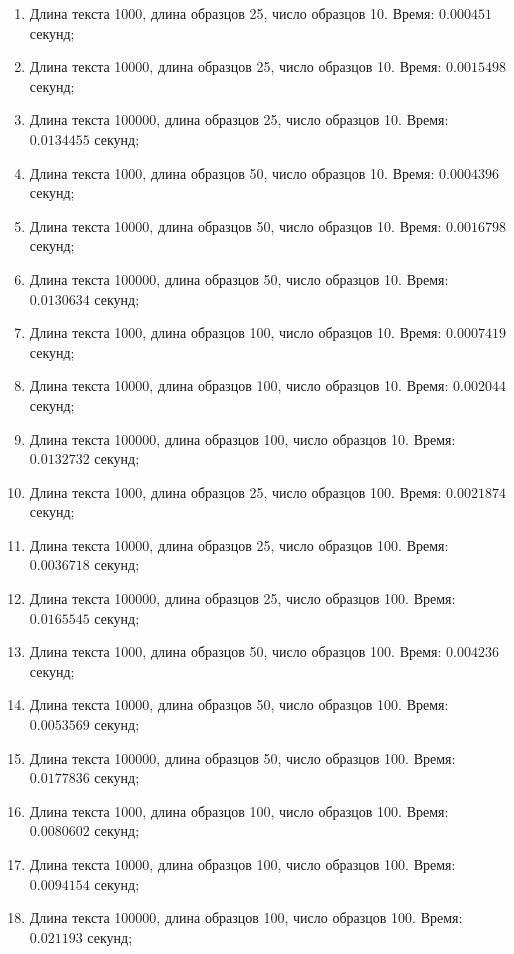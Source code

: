 \documentclass[12pt]{article}
\begin{document}
\begin{enumerate}
	\item Длина текста 1000, длина образцов 25, число образцов 10. Время: $0.000451$ секунд;
	\item Длина текста 10000, длина образцов 25, число образцов 10. Время: $0.0015498$ секунд;
	\item Длина текста 100000, длина образцов 25, число образцов 10. Время: $0.0134455$ секунд;
	\item Длина текста 1000, длина образцов 50, число образцов 10. Время: $0.0004396$ секунд;
	\item Длина текста 10000, длина образцов 50, число образцов 10. Время: $0.0016798$ секунд;
	\item Длина текста 100000, длина образцов 50, число образцов 10. Время: $0.0130634$ секунд;
	\item Длина текста 1000, длина образцов 100, число образцов 10. Время: $0.0007419$ секунд;
	\item Длина текста 10000, длина образцов 100, число образцов 10. Время: $0.002044$ секунд;
	\item Длина текста 100000, длина образцов 100, число образцов 10. Время: $0.0132732$ секунд;
	
	\item Длина текста 1000, длина образцов 25, число образцов 100. Время: $0.0021874$ секунд;
	\item Длина текста 10000, длина образцов 25, число образцов 100. Время: $0.0036718$ секунд;
	\item Длина текста 100000, длина образцов 25, число образцов 100. Время: $0.0165545$ секунд;
	\item Длина текста 1000, длина образцов 50, число образцов 100. Время: $0.004236$ секунд;
	\item Длина текста 10000, длина образцов 50, число образцов 100. Время: $0.0053569$ секунд;
	\item Длина текста 100000, длина образцов 50, число образцов 100. Время: $0.0177836$ секунд;
	\item Длина текста 1000, длина образцов 100, число образцов 100. Время: $0.0080602$ секунд;
	\item Длина текста 10000, длина образцов 100, число образцов 100. Время: $0.0094154$ секунд;
	\item Длина текста 100000, длина образцов 100, число образцов 100. Время: $0.021193$ секунд;
	

\end{enumerate}
\end{document}
